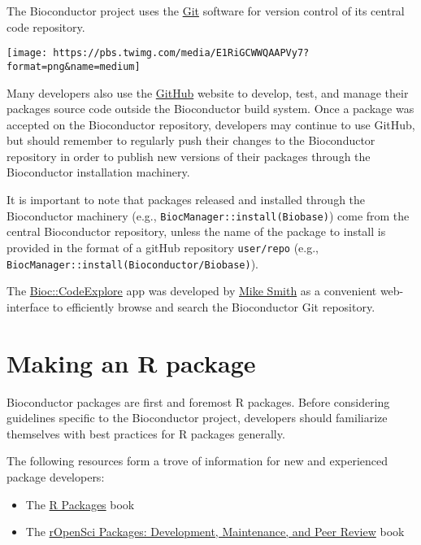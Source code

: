 \documentclass[
]{book}
\providecommand{\tightlist}{%
  \setlength{\itemsep}{0pt}\setlength{\parskip}{0pt}}
\begin{document}
The Bioconductor project uses the \href{https://git-scm.com/}{Git} software for version control of its central code repository.

\begin{center}\texttt{[image: https://pbs.twimg.com/media/E1RiGCWWQAAPVy7?format=png\&name=medium]} \end{center}

Many developers also use the \href{https://github.com/}{GitHub} website to develop, test, and manage their packages source code outside the Bioconductor build system.
Once a package was accepted on the Bioconductor repository, developers may continue to use GitHub, but should remember to regularly push their changes to the Bioconductor repository in order to publish new versions of their packages through the Bioconductor installation machinery.

It is important to note that packages released and installed through the Bioconductor machinery (e.g., \texttt{BiocManager::install(\textquotesingle{}Biobase\textquotesingle{})}) come from the central Bioconductor repository, unless the name of the package to install is provided in the format of a gitHub repository \texttt{user/repo} (e.g., \texttt{BiocManager::install(\textquotesingle{}Bioconductor/Biobase\textquotesingle{})}).

The \href{https://code.bioconductor.org/}{Bioc::CodeExplore} app was developed by \href{https://github.com/grimbough}{Mike Smith} as a convenient web-interface to efficiently browse and search the Bioconductor Git repository.

\hypertarget{r-package}{%
\chapter{Making an R package}\label{r-package}}

Bioconductor packages are first and foremost R packages.
Before considering guidelines specific to the Bioconductor project, developers should familiarize themselves with best practices for R packages generally.

The following resources form a trove of information for new and experienced package developers:

\begin{itemize}
\tightlist
\item
  The \href{https://r-pkgs.org/}{R Packages} book
\item
  The \href{https://devguide.ropensci.org/building.html}{rOpenSci Packages: Development, Maintenance, and Peer Review} book
\end{itemize}
\end{document}
